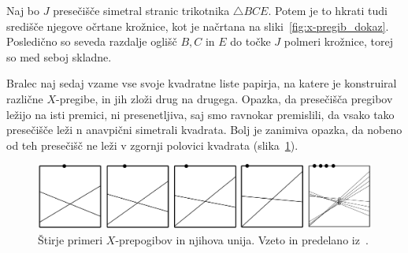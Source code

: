 Naj bo $J$ presečišče simetral stranic trikotnika $\triangle BCE$. Potem je to hkrati tudi središče njegove očrtane krožnice, kot je načrtana na sliki~\ref{fig:x-pregib_dokaz}. Posledično so seveda razdalje oglišč $B, C$ in $E$ do točke $J$ polmeri krožnice, torej so med seboj skladne.

Bralec naj sedaj vzame vse svoje kvadratne liste papirja, na katere je konstruiral različne $X$-pregibe, in jih zloži drug na drugega. Opazka, da presečišča pregibov ležijo na isti premici, ni presenetljiva, saj smo ravnokar premislili, da vsako tako presečišče leži n anavpični simetrali kvadrata. Bolj je zanimiva opazka, da nobeno od teh presečišč ne leži v zgornji polovici kvadrata (slika~\ref{fig:x-pregib_primeri_skup}).

\begin{figure}[h]
    \centering
    \includegraphics[width=\textwidth]{images/x-pregibi/primeri_skupaj.png}
    \caption[Primeri $X$-pregibov]{Štirje primeri $X$-prepogibov in njihova unija. Vzeto in predelano iz~\cite[str.\ 36]{haga2008}.}
    \label{fig:x-pregib_primeri_skup}
\end{figure}

